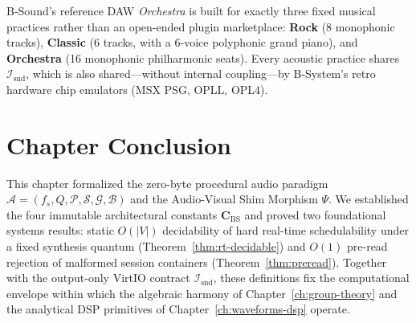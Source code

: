 B-Sound's reference DAW \emph{Orchestra} is built for exactly three fixed musical practices rather than an open-ended plugin marketplace: \textbf{Rock} (8 monophonic tracks), \textbf{Classic} (6 tracks, with a 6-voice polyphonic grand piano), and \textbf{Orchestra} (16 monophonic philharmonic seats). Every acoustic practice shares $\mathcal{I}_{\mathrm{snd}}$, which is also shared—without internal coupling—by B-System's retro hardware chip emulators (MSX PSG, OPLL, OPL4).

\section{Chapter Conclusion}

This chapter formalized the zero-byte procedural audio paradigm $\mathcal{A} = (f_s, Q, \mathcal{P}, \mathcal{S}, \mathcal{G}, \mathcal{B})$ and the Audio-Visual Shim Morphism $\Psi$. We established the four immutable architectural constants $\mathbf{C}_{\mathrm{BS}}$ and proved two foundational systems results: static $O(|V|)$ decidability of hard real-time schedulability under a fixed synthesis quantum (Theorem~\ref{thm:rt-decidable}) and $O(1)$ pre-read rejection of malformed session containers (Theorem~\ref{thm:preread}). Together with the output-only VirtIO contract $\mathcal{I}_{\mathrm{snd}}$, these definitions fix the computational envelope within which the algebraic harmony of Chapter~\ref{ch:group-theory} and the analytical DSP primitives of Chapter~\ref{ch:waveforms-dsp} operate.
